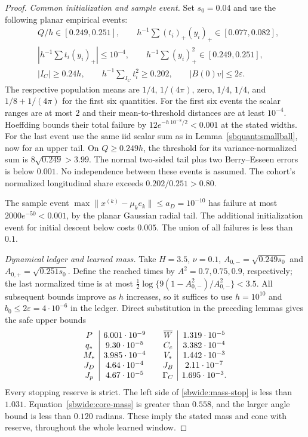 \documentclass[11pt]{article}
\theoremstyle{remark}
\begin{document}
\begin{proof}
\emph{Common initialization and sample event.}
Set $s_0=0.04$ and use the following planar empirical events:
\begin{align*}
 &Q/h\in[0.249,0.251],\qquad
 h^{-1}\sum(t_i)_+(y_i)_+\in[0.077,0.082],\\
 &\left|h^{-1}\sum t_i(y_i)_+\right|\le10^{-4},\qquad
 h^{-1}\sum(y_i)_+^2\in[0.249,0.251],\\
 &|I_C|\ge0.24h,\qquad h^{-1}\sum_{I_C}t_i^2\ge0.202,
 \qquad |B(0)v|\le2\varepsilon.
\end{align*}
The respective population means are $1/4$, $1/(4\pi)$, zero, $1/4$,
$1/4$, and $1/8+1/(4\pi)$ for the first six quantities.
For the first six events the scalar ranges are at most $2$ and their
mean-to-threshold distances are at least $10^{-4}$. Hoeffding bounds
their total failure by $12e^{-h\,10^{-8}/2}<0.001$ at the stated
widths. For the last event use the same iid scalar sum as in
Lemma~\ref{sbquant:smallball}, now for an upper tail. On $Q\ge0.249h$,
the threshold for its variance-normalized sum is
$8\sqrt{0.249}>3.99$. The normal two-sided tail plus two
Berry--Esseen errors is below $0.001$. No independence between these
events is assumed. The cohort's normalized longitudinal share exceeds
$0.202/0.251>0.80$.

The sample event $\max\|x^{(k)}-\mu_ke_k\|\le a_D=10^{-10}$ has failure
at most $2000e^{-50}<0.001$, by the planar Gaussian radial tail.
The additional initialization event for initial descent below costs
$0.005$. The union of all failures is less than $0.1$.

\emph{Dynamical ledger and learned mass.}
Take $H=3.5$, $\nu=0.1$,
$A_{0,-}=\sqrt{0.249s_0}$ and $A_{0,+}=\sqrt{0.251s_0}$.
Define the reached times by $A^2=0.7,0.75,0.9$, respectively;
the last normalized time is at most
$\frac12\log\{9(1-A_{0,-}^2)/A_{0,-}^2\}<3.5$.
All subsequent bounds improve as $h$ increases, so it suffices to use
$h=10^{10}$ and $b_0\le2\varepsilon=4\cdot10^{-6}$ in the ledger.
Direct substitution in the preceding lemmas gives the safe upper bounds
\[
\begin{array}{c|c@{\qquad}c|c}
 P&6.001\cdot10^{-9}&\overline W&1.319\cdot10^{-5}\\
 q_*&9.30\cdot10^{-5}&C_c&3.382\cdot10^{-4}\\
 M_*&3.985\cdot10^{-4}&V_*&1.442\cdot10^{-3}\\
 J_D&4.64\cdot10^{-4}&J_B&2.11\cdot10^{-7}\\
 J_p&4.67\cdot10^{-5}&\Gamma_C&1.695\cdot10^{-3}.
\end{array}
\]
Every stopping reserve is strict. The left side of
\eqref{sbwide:mass-stop} is less than $1.031$.
Equation~\eqref{sbwide:core-mass} is greater than $0.558$, and the
larger angle bound is less than $0.120$ radians. These imply the stated
mass and cone with reserve, throughout the whole learned window.


\end{proof}
\end{document}
